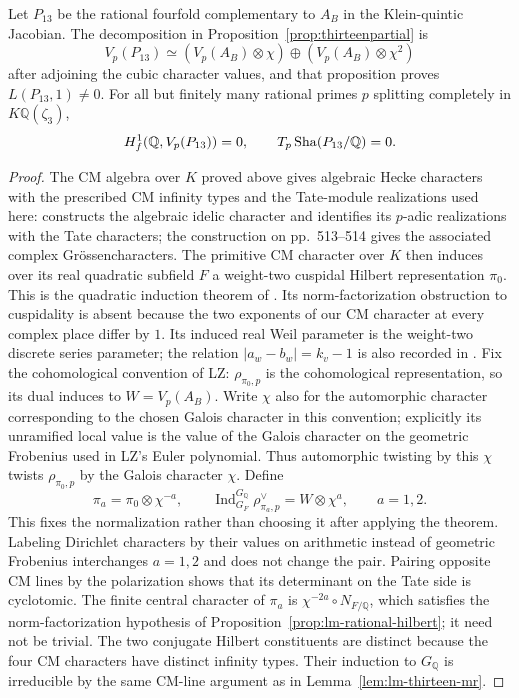 \begin{proposition}
\label{prop:lm-thirteen-split-prime}
Let $P_{13}$ be the rational fourfold complementary to $A_B$ in the
Klein-quintic Jacobian.  The decomposition in Proposition~\ref{prop:thirteenpartial} is
\[
 V_p(P_{13})\simeq
 (V_p(A_B)\otimes\chi)\oplus(V_p(A_B)\otimes\chi^2)
\]
after adjoining the cubic character values, and that proposition proves $L(P_{13},1)\ne0$.  For all but finitely many rational primes $p$ splitting completely in
$K\mathbb Q(\zeta_3)$,
\[
 H^1_f(\mathbb Q,V_p(P_{13}))=0,
 \qquad T_p\operatorname{Sha}(P_{13}/\mathbb Q)=0.
\]
\end{proposition}
\begin{proof}
The CM algebra over $K$ proved above gives algebraic Hecke characters
with the prescribed CM infinity types and the Tate-module realizations
used here: \citet[\S7, Theorem~10, pp.~511--512; Theorem~11(i),
p.~512]{SerreTate1968} constructs the algebraic idelic character and
identifies its $p$-adic realizations with the Tate characters; the
construction on pp.~513--514 gives the associated complex
Gr\"ossencharacters.
The primitive CM character over $K$ then induces over its real quadratic
subfield $F$ a weight-two cuspidal Hilbert representation $\pi_0$.
This is the quadratic induction theorem of
\citet[Proposition~12.1, p.~206 in the retypeset author version]{JacquetLanglands1970}.
Its norm-factorization obstruction to cuspidality is absent because
the two exponents of our CM character at every complex place differ
by $1$.  Its induced real Weil parameter is the weight-two discrete
series parameter; the relation $|a_w-b_w|=k_v-1$ is also recorded
in \citet[Proposition~B.2.7, pp.~654--655]{Nekovar2012}.
Fix the cohomological convention of LZ: $\rho_{\pi_0,p}$ is the
cohomological representation, so its dual induces to
$W=V_p(A_B)$.  Write $\chi$ also for the automorphic character
corresponding to the chosen Galois character in this convention;
explicitly its unramified local value is the value of the Galois
character on the geometric Frobenius used in LZ's Euler polynomial.
Thus automorphic twisting by this $\chi$ twists $\rho_{\pi_0,p}$
by the Galois character $\chi$.  Define
\[
 \pi_a=\pi_0\otimes\chi^{-a},\qquad
 \operatorname{Ind}_{G_F}^{G_{\mathbb Q}}\rho_{\pi_a,p}^{\vee}
      =W\otimes\chi^a,\qquad a=1,2.
\]
This fixes the normalization rather than choosing it after applying
the theorem.  Labeling Dirichlet characters by their values on
arithmetic instead of geometric Frobenius interchanges $a=1,2$
and does not change the pair.  Pairing opposite CM lines by the
polarization shows that its determinant on the Tate side is
cyclotomic.  The finite central character of $\pi_a$ is
$\chi^{-2a}\circ N_{F/\mathbb Q}$, which satisfies the
norm-factorization hypothesis of
Proposition~\ref{prop:lm-rational-hilbert}; it need not be trivial.
The two conjugate Hilbert constituents are distinct because the
four CM characters have distinct infinity types.  Their induction
to $G_{\mathbb Q}$ is irreducible by the same CM-line argument as
in Lemma~\ref{lem:lm-thirteen-mr}.


\end{proof}
